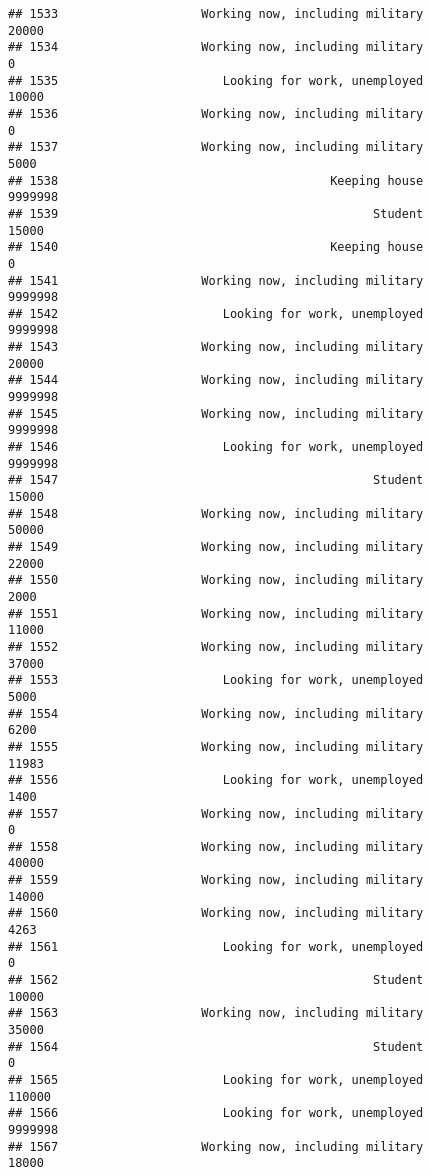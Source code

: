 \documentclass[]{book}
\theoremstyle{definition}
\theoremstyle{definition}
\theoremstyle{remark}
\begin{document}
\begin{verbatim}
## 1533                    Working now, including military           20000
## 1534                    Working now, including military               0
## 1535                       Looking for work, unemployed           10000
## 1536                    Working now, including military               0
## 1537                    Working now, including military            5000
## 1538                                      Keeping house         9999998
## 1539                                            Student           15000
## 1540                                      Keeping house               0
## 1541                    Working now, including military         9999998
## 1542                       Looking for work, unemployed         9999998
## 1543                    Working now, including military           20000
## 1544                    Working now, including military         9999998
## 1545                    Working now, including military         9999998
## 1546                       Looking for work, unemployed         9999998
## 1547                                            Student           15000
## 1548                    Working now, including military           50000
## 1549                    Working now, including military           22000
## 1550                    Working now, including military            2000
## 1551                    Working now, including military           11000
## 1552                    Working now, including military           37000
## 1553                       Looking for work, unemployed            5000
## 1554                    Working now, including military            6200
## 1555                    Working now, including military           11983
## 1556                       Looking for work, unemployed            1400
## 1557                    Working now, including military               0
## 1558                    Working now, including military           40000
## 1559                    Working now, including military           14000
## 1560                    Working now, including military            4263
## 1561                       Looking for work, unemployed               0
## 1562                                            Student           10000
## 1563                    Working now, including military           35000
## 1564                                            Student               0
## 1565                       Looking for work, unemployed          110000
## 1566                       Looking for work, unemployed         9999998
## 1567                    Working now, including military           18000

\end{verbatim}
\end{document}
